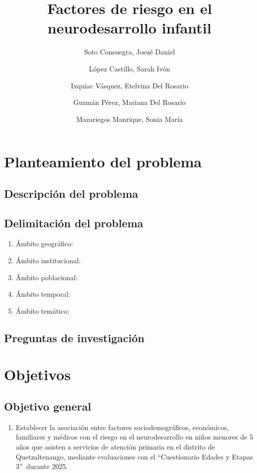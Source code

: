 \documentclass[11pt,letterpaper]{report}
\title{Factores de riesgo en el neurodesarrollo infantil}
\author{Soto Consuegra, Josué Daniel \and López Castillo, Sarah Ivón \and
Ixquiac Vásquez, Etelvina Del Rosario \and Guzmán Pérez, Mariana Del Rosario
\and Mazariegos Manrique, Sonia María}
\newcommand{\asq}{“Cuestionario Edades y Etapas 3”}
\begin{document}
	\tableofcontents
	\chapter{Planteamiento del problema}
\section{Descripción del problema}
\section{Delimitación del problema}
	\begin{enumerate}
		\item Ámbito geográfico:
		\item Ámbito institucional:
		\item Ámbito poblacional:
		\item Ámbito temporal:
		\item Ámbito temático:
	\end{enumerate}
\section{Preguntas de investigación}

	\chapter{Objetivos}
\section{Objetivo general}
	\begin{enumerate}
		\item Establecer la asociación entre factores sociodemográficos,
		económicos, familiares y médicos con el riesgo en el neurodesarrollo en
		niños menores de 5 años que asisten a servicios de atención primaria en
		el distrito de Quetzaltenango, mediante evaluaciones con el \asq\
		durante 2025.
	\end{enumerate}
\end{document}

